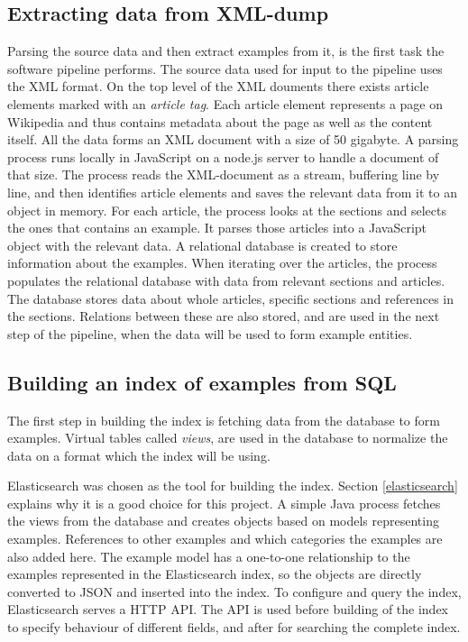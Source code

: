 \subsection{Extracting data from XML-dump}
Parsing the source data and then extract examples from it, is the first task the software pipeline performs. The source data used for input to the pipeline uses the XML format. On the top level of the XML douments there exists article elements marked with an \textit{article tag}. Each article element represents a page on Wikipedia and thus contains metadata about the page as well as the content itself. All the data forms an XML document with a size of 50 gigabyte. A parsing process runs locally in JavaScript on a node.js server to handle a document of that size. The process reads the XML-document as a stream, buffering line by line, and then identifies article elements and saves the relevant data from it to an object in memory. For each article, the process looks at the sections and selects the ones that contains an example. It parses those articles into a JavaScript object with the relevant data. A relational database is created to store information about the examples. When iterating over the articles, the process populates the relational database with data from relevant sections and articles. The database stores data about whole articles, specific sections and references in the sections. Relations between these are also stored, and are used in the next step of the pipeline, when the data will be used to form example entities. 

\subsection{Building an index of examples from SQL}
The first step in building the index is fetching data from the database to form examples. Virtual tables called \textit{views}, are used in the database to normalize the data on a format which the index will be using.

Elasticsearch was chosen as the tool for building the index. Section \ref{elasticsearch} explains why it is a good choice for this project. A simple Java process fetches the views from the database and creates objects based on models representing examples. References to other examples and which categories the examples are also added here. The example model has a one-to-one relationship to the examples represented in the Elasticsearch index, so the objects are directly converted to JSON and inserted into the index. To configure and query the index, Elasticsearch serves a HTTP API. The API is used before building of the index to specify behaviour of different fields, and after for searching the complete index.


